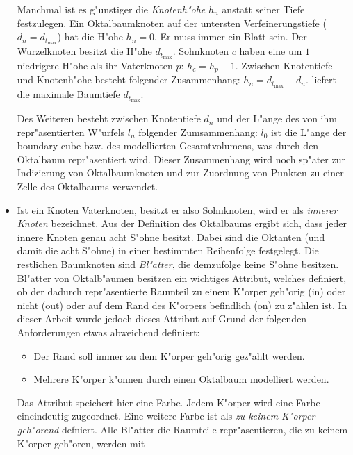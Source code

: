 \begin{itemize}
    Manchmal ist es g"unstiger die \emph{Knotenh"ohe} $h_n$ anstatt seiner 
    Tiefe festzulegen. Ein Oktalbaumknoten auf der untersten Verfeinerungstiefe
    ($d_n = d_{t_{\max}}$) hat die H"ohe $h_n = 0$. Er muss immer ein Blatt 
    sein.
    Der Wurzelknoten besitzt die H"ohe $d_{t_{\max}}$. Sohnknoten $c$ haben 
    eine um $1$ niedrigere H"ohe als ihr Vaterknoten $p$: $h_c = h_p - 1$.
    Zwischen Knotentiefe und Knotenh"ohe besteht folgender Zusammenhang: 
    \hbox{\(h_n = d_{t_{\max}} - d_n\)}.
    \oplistbeg
    \opitem {} liefert die maximale 
	Baumtiefe $d_{t_{\max}}$.
    \oplistend
    
    Des Weiteren besteht zwischen Knotentiefe $d_n$ und der L"ange des 
    von ihm repr"asentierten W"urfels $l_n$ folgender Zumsammenhang:
    $l_0$ ist die L"ange der boundary cube bzw. des modellierten 
    Gesamtvolumens, was durch den Oktalbaum repr"asentiert wird. Dieser 
    Zusammenhang wird noch sp"ater zur Indizierung von Oktalbaumknoten 
    und zur Zuordnung von Punkten zu einer Zelle des Oktalbaums verwendet. 
\item Ist ein Knoten Vaterknoten, besitzt er also Sohnknoten, wird er als 
    \emph{innerer Knoten} bezeichnet. Aus der Definition des Oktalbaums ergibt 
    sich, dass jeder innere Knoten genau acht S"ohne besitzt. Dabei sind 
    die Oktanten (und damit die acht S"ohne) in einer bestimmten Reihenfolge 
    festgelegt.
    Die restlichen Baumknoten sind \emph{Bl"atter}, die demzufolge keine 
    S"ohne besitzen. Bl"atter von Oktalb"aumen besitzen ein wichtiges 
    Attribut, welches definiert, ob der dadurch repr"asentierte Raumteil zu 
    einem K"orper geh"orig (in) oder nicht (out) oder auf dem Rand des 
    K"orpers 
    befindlich (on) zu z"ahlen ist. In dieser Arbeit wurde jedoch dieses 
    Attribut auf Grund der folgenden Anforderungen etwas abweichend 
    definiert: 
    \begin{itemize}
    \item Der Rand soll immer zu dem K"orper 
geh"orig gez"ahlt werden. 
    \item Mehrere K"orper k"onnen durch einen 
Oktalbaum modelliert werden. 
    \end{itemize}
    Das Attribut speichert hier eine Farbe. 
    Jedem K"orper wird eine Farbe eineindeutig zugeordnet. Eine weitere 
    Farbe ist als \emph{zu keinem K"orper geh"orend} defniert. Alle Bl"atter 
    die Raumteile repr"asentieren, die zu keinem K"orper geh"oren, werden mit 

\end{itemize}
